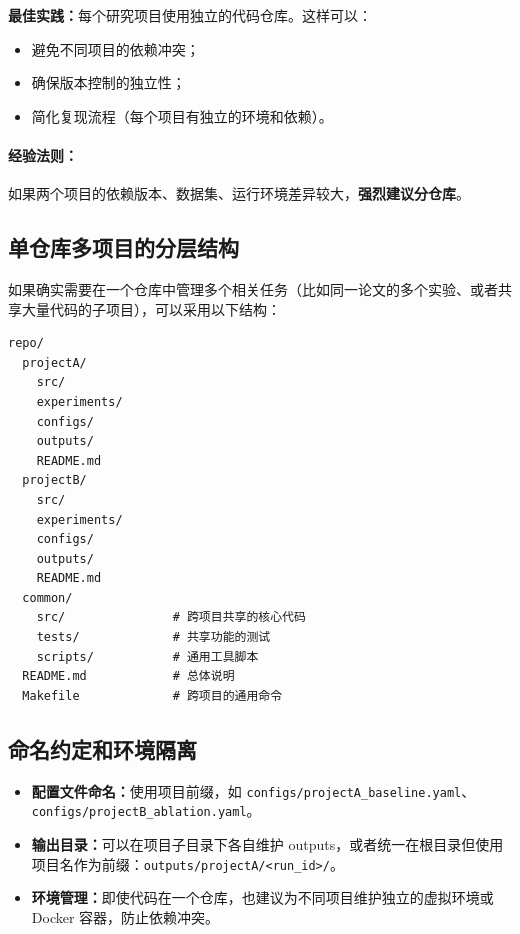 \textbf{最佳实践：}每个研究项目使用独立的代码仓库。这样可以：
\begin{itemize}
  \item 避免不同项目的依赖冲突；
  \item 确保版本控制的独立性；
  \item 简化复现流程（每个项目有独立的环境和依赖）。
\end{itemize}

\paragraph{经验法则：}如果两个项目的依赖版本、数据集、运行环境差异较大，\textbf{强烈建议分仓库}。

\subsection{单仓库多项目的分层结构}

如果确实需要在一个仓库中管理多个相关任务（比如同一论文的多个实验、或者共享大量代码的子项目），可以采用以下结构：

\begin{verbatim}
repo/
  projectA/
    src/
    experiments/
    configs/
    outputs/
    README.md
  projectB/
    src/
    experiments/
    configs/
    outputs/
    README.md
  common/
    src/               # 跨项目共享的核心代码
    tests/             # 共享功能的测试
    scripts/           # 通用工具脚本
  README.md            # 总体说明
  Makefile             # 跨项目的通用命令
\end{verbatim}

\subsection{命名约定和环境隔离}

\begin{itemize}
  \item \textbf{配置文件命名：}使用项目前缀，如 \texttt{configs/projectA\_baseline.yaml}、\texttt{configs/projectB\_ablation.yaml}。

  \item \textbf{输出目录：}可以在项目子目录下各自维护 outputs，或者统一在根目录但使用项目名作为前缀：\texttt{outputs/projectA/<run\_id>/}。

  \item \textbf{环境管理：}即使代码在一个仓库，也建议为不同项目维护独立的虚拟环境或 Docker 容器，防止依赖冲突。
\end{itemize}

